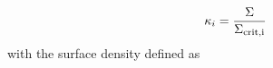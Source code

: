 \begin{equation}
\kappa_i = \frac{\Sigma}{\Sigma_{\rm{crit}, i}}
\end{equation}
with the surface density defined as